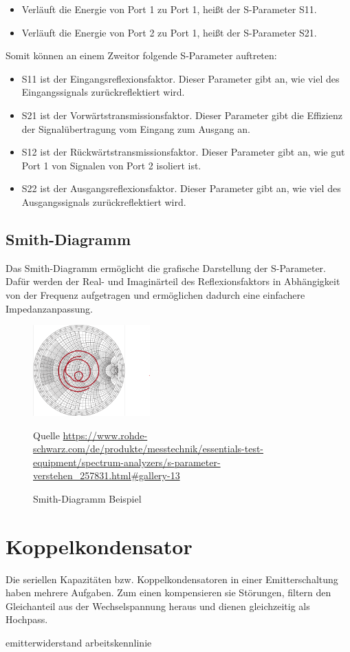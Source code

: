 \begin{itemize}
    \item Verläuft die Energie von Port 1 zu Port 1, heißt der S-Parameter S11.
    \item Verläuft die Energie von Port 2 zu Port 1, heißt der S-Parameter S21.
\end{itemize}
Somit können an einem Zweitor folgende S-Parameter auftreten:
\begin{itemize}
    \item S11 ist der Eingangsreflexionsfaktor. Dieser Parameter gibt an, wie viel des Eingangssignals zurückreflektiert wird.
    \item S21 ist der Vorwärtstransmissionsfaktor. Dieser Parameter gibt die Effizienz der Signalübertragung vom Eingang zum Ausgang an.
    \item S12 ist der Rückwärtstransmissionsfaktor. Dieser Parameter gibt an, wie gut Port 1 von Signalen von Port 2 isoliert ist.
    \item S22 ist der Ausgangsreflexionsfaktor. Dieser Parameter gibt an, wie viel des Ausgangssignals zurückreflektiert wird.
\end{itemize}

\subsection{Smith-Diagramm}
Das Smith-Diagramm ermöglicht die grafische Darstellung der S-Parameter.
Dafür werden der Real- und Imaginärteil des Reflexionsfaktors in Abhängigkeit von der Frequenz
aufgetragen und ermöglichen dadurch eine einfachere Impedanzanpassung.
\begin{figure}[h]
    \centering
    \includegraphics[width=0.4\textwidth]{Pictures/SmithDiagram.png}
    \caption{Smith-Diagramm Beispiel}
    \footnotesize{Quelle \url{https://www.rohde-schwarz.com/de/produkte/messtechnik/essentials-test-equipment/spectrum-analyzers/s-parameter-verstehen_257831.html#gallery-13}}
\end{figure}

\section{Koppelkondensator}
Die seriellen Kapazitäten bzw. Koppelkondensatoren in einer Emitterschaltung haben mehrere Aufgaben. Zum einen kompensieren sie Störungen, filtern den Gleichanteil aus der Wechselspannung 
heraus und dienen gleichzeitig als Hochpass.
\clearpage

emitterwiderstand
arbeitskennlinie